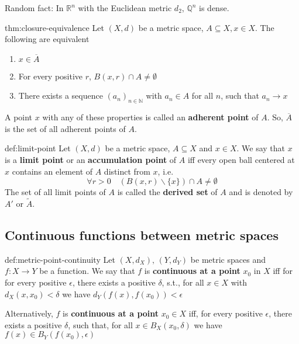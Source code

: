 \documentclass[landscape, 8pt]{extarticle}
\begin{document}
\begin{multicols}{3}
Random fact: In $\mathbb{R}^{n}$ with the Euclidean metric $d_{2}$, $\mathbb{Q}^{n}$ is dense.

\begin{thm}{thm:closure-equivalence}{}
    Let $(X, d)$ be a metric space, $A \subseteq X, x\in X$. The following are equivalent
    \begin{enumerate}
        \item $x\in\overline{A}$
        \item For every positive $r$, $B(x,r) \cap A \ne \emptyset$
        \item There exists a sequence $(a_{n})_{n\in \mathbb{N}}$ with $a_{n}\in A$ for all $n$, such that $a_{n}\to x$
    \end{enumerate}
    A point $x$ with any of these properties is called an \textbf{adherent point} of $A$. So, $\overline{A}$ is the set of all adherent points of $A$.
\end{thm}

\begin{dfn}{def:limit-point}{}
    Let $(X, d)$ be a metric space, $A \subseteq X$ and $x\in X$. We say that $x$ is a \textbf{limit point} or an \textbf{accumulation point} of $A$ iff every open ball centered at $x$ contains an element of $A$ distinct from $x$, i.e.
    \[\forall r > 0 \quad (B(x,r) \backslash \{x\}) \cap A \ne \emptyset\]
    The set of all limit points of $A$ is called the \textbf{derived set} of $A$ and is denoted by $A'$ or $\tilde{A}$.
\end{dfn}

\subsection{Continuous functions between metric spaces}

\begin{dfn}{def:metric-point-continuity}{}
    Let $(X, d_{X}),\, (Y,d_{Y})$ be metric spaces and $f: X \to Y $ be a function. We say that $f$ is \textbf{continuous at a point} $x_{0}$ in $X$ iff for for every positive $\epsilon$, there exists a positive $\delta$, s.t., for all $x\in X$ with $d_{X}(x,x_{0}) < \delta$ we have $d_{Y}(f(x), f(x_{0})) < \epsilon$
    
    \longrule{0.08ex}
    Alternatively, $f$ is \textbf{continuous at a point} $x_{0}\in X$ iff, for every positive $\epsilon$, there exists a positive $\delta$, such that, for all $x\in B_{X}(x_{0}, \delta)$ we have $f(x)\in B_{Y}(f(x_{0}), \epsilon)$
\end{dfn}


\end{multicols}
\end{document}

